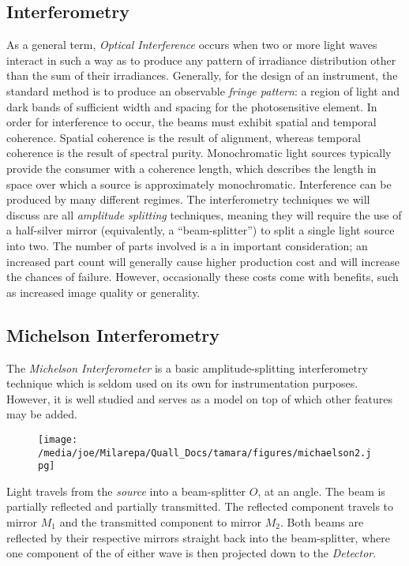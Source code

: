 \documentclass[a4paper,10pt]{report}
\numberwithin{equation}{section}
\begin{document}
 \subsection{Interferometry}
 As a general term, \emph{Optical Interference} occurs when two or more light waves interact in such a way as to produce any pattern of irradiance distribution other than the sum of their irradiances.\cite[p.~367]{Hecht1987} Generally, for the design of an instrument, the standard method is to produce an observable \emph{fringe pattern}: a region of light and dark bands of sufficient width and spacing for the photosensitive element. In order for interference to occur, the beams must exhibit spatial and temporal coherence. Spatial coherence is the result of alignment, whereas temporal coherence is the result of spectral purity.\cite[p.~371]{Hecht1987} Monochromatic light sources typically provide the consumer with a coherence length, which describes the length in space over which a source is approximately monochromatic. \cite[p.~298]{Hecht1987} Interference can be produced by many different regimes. The interferometry techniques we will discuss are all \emph{amplitude splitting} techniques, meaning they will 
require the use of a half-silver mirror (equivalently, a ``beam-splitter'') to split a single light source into two. The number of parts involved is a in important consideration; an increased part count will generally cause higher production cost and will increase the chances of failure. However, occasionally these costs come with benefits, such as increased image quality or generality.
 \subsection{Michelson Interferometry}
 The \emph{Michelson Interferometer} is a basic amplitude-splitting interferometry technique which is seldom used on its own for instrumentation purposes.\cite[p.~387]{Hecht1987} However, it is well studied and serves as a model on top of which other features may be added. 
\begin{figure}
\texttt{[image: /media/joe/Milarepa/Quall\_Docs/tamara/figures/michaelson2.jpg]}
\end{figure}
 Light travels from the \emph{source} into a beam-splitter $O$, at an angle. The beam is partially reflected and partially transmitted. The reflected component travels to mirror $M_1$ and the transmitted component to mirror $M_2$. Both beams are reflected by their respective mirrors straight back into the beam-splitter, where one component of the of either wave is then projected down to the \emph{Detector}.
 
\end{document}
